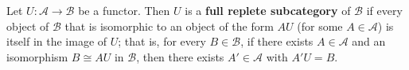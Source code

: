 Let $U: \mathcal{A} \to \mathcal{B}$ be a functor. Then $U$ is a \textbf{full replete subcategory} of $\mathcal{B}$ if every object of $\mathcal{B}$ that is isomorphic to an object of the form $AU$ (for some $A \in \mathcal{A}$) is itself in the image of $U$; that is, for every $B \in \mathcal{B}$, if there exists $A \in \mathcal{A}$ and an isomorphism $B \cong AU$ in $\mathcal{B}$, then there exists $A' \in \mathcal{A}$ with $A'U = B$.
